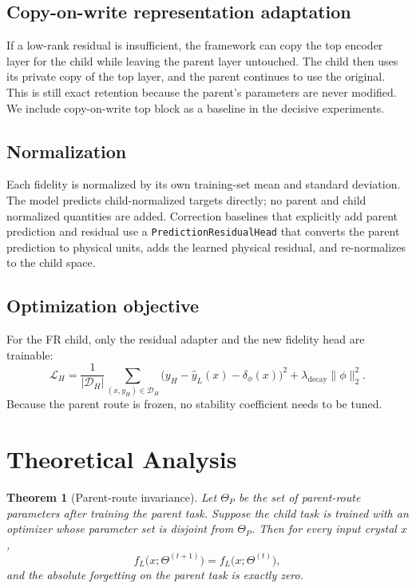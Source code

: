 \documentclass{article}
\theoremstyle{plain}
\newtheorem{theorem}{Theorem}[section]
\theoremstyle{definition}
\theoremstyle{remark}
\begin{document}
\subsection{Copy-on-write representation adaptation}

If a low-rank residual is insufficient, the framework can copy the top encoder layer for the child while leaving the parent layer untouched. The child then uses its private copy of the top layer, and the parent continues to use the original. This is still exact retention because the parent's parameters are never modified. We include copy-on-write top block as a baseline in the decisive experiments.

\subsection{Normalization}

Each fidelity is normalized by its own training-set mean and standard deviation. The model predicts child-normalized targets directly; no parent and child normalized quantities are added. Correction baselines that explicitly add parent prediction and residual use a \texttt{PredictionResidualHead} that converts the parent prediction to physical units, adds the learned physical residual, and re-normalizes to the child space.

\subsection{Optimization objective}

For the FR child, only the residual adapter and the new fidelity head are trainable:
\begin{equation}
\mathcal L_H = \frac{1}{|\mathcal D_H|} \sum_{(x,y_H)\in\mathcal D_H} \bigl(y_H - \hat y_L(x) - \delta_\phi(x)\bigr)^2 + \lambda_{\mathrm{decay}}\|\phi\|_2^2.
\label{eq:child-loss}
\end{equation}
Because the parent route is frozen, no stability coefficient needs to be tuned.

\section{Theoretical Analysis}

\begin{theorem}[Parent-route invariance]
\label{thm:invariance}
Let $\Theta_P$ be the set of parent-route parameters after training the parent task. Suppose the child task is trained with an optimizer whose parameter set is disjoint from $\Theta_P$. Then for every input crystal $x$,
\begin{equation}
f_L\bigl(x; \Theta^{(t+1)}\bigr) = f_L\bigl(x; \Theta^{(t)}\bigr),
\end{equation}
and the absolute forgetting on the parent task is exactly zero.
\end{theorem}
\end{document}

